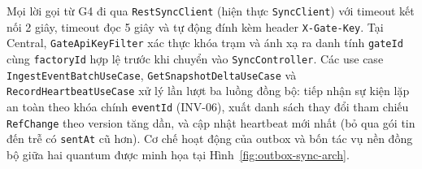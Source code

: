 Mọi lời gọi từ G4 đi qua \texttt{RestSyncClient} (hiện thực \texttt{SyncClient}) với timeout kết nối
2 giây, timeout đọc 5 giây và tự động đính kèm header \texttt{X-Gate-Key}. Tại Central,
\texttt{GateApiKeyFilter} xác thực khóa trạm và ánh xạ ra danh tính \texttt{gateId} cùng
\texttt{factoryId} hợp lệ trước khi chuyển vào \texttt{SyncController}. Các use case
\texttt{IngestEventBatchUseCase}, \texttt{GetSnapshotDeltaUseCase} và
\texttt{RecordHeartbeatUseCase} xử lý lần lượt ba luồng đồng bộ: tiếp nhận sự kiện lặp an toàn theo
khóa chính \texttt{eventId} (INV-06), xuất danh sách thay đổi tham chiếu \texttt{RefChange} theo
version tăng dần, và cập nhật heartbeat mới nhất (bỏ qua gói tin đến trễ có \texttt{sentAt} cũ hơn).
Cơ chế hoạt động của outbox và bốn tác vụ nền đồng bộ giữa hai quantum được minh họa tại
Hình~\ref{fig:outbox-sync-arch}.

